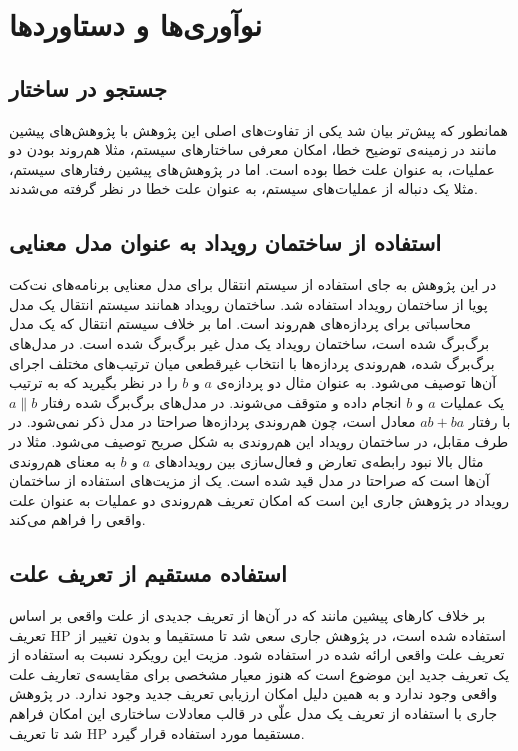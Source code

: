 \documentclass[
msc,
irfonts
]{./tex/tehran-thesis}
\newcommand{\پ}{پروژه/پایان‌نامه/رساله }
\theoremstyle{definition}
\theoremstyle{theorem}
\theoremstyle{definition}
\numberwithin{algorithm}{chapter}
\begin{document}
 \section{نوآوری‌ها و دستاورد‌ها}

 \subsection{جستجو در ساختار}
همانطور که پیش‌تر بیان شد یکی از تفاوت‌های اصلی این پژوهش با پژوهش‌های پیشین مانند
\cite{causality-checking,chockler,causal-hml}
در زمینه‌ی توضیح خطا، امکان معرفی ساختار‌های سیستم، مثلا هم‌روند بودن دو عملیات، به عنوان علت خطا بوده است.
اما در پژوهش‌های پیشین رفتار‌های سیستم، مثلا یک دنباله از عملیات‌های سیستم، به عنوان علت خطا در نظر گرفته می‌شدند.


 \subsection{استفاده از ساختمان رویداد به عنوان مدل معنایی}
در این پژوهش به جای استفاده از سیستم انتقال برای مدل معنایی برنامه‌های نت‌کت پویا از ساختمان رویداد استفاده شد.
ساختمان رویداد همانند سیستم انتقال یک مدل محاسباتی برای پردازه‌های هم‌روند است. 
اما بر خلاف سیستم انتقال که یک مدل برگ‌برگ شده است، ساختمان رویداد یک مدل غیر برگ‌برگ شده است.
در مدل‌های برگ‌برگ‌ شده، هم‌روندی پردازه‌ها با انتخاب غیرقطعی میان ترتیب‌های مختلف اجرای آن‌ها توصیف می‌شود.
به عنوان مثال دو پردازه‌ی 
$a$
و
$b$
را در نظر بگیرید که به ترتیب یک عملیات 
$a$
و
$b$
انجام داده و متوقف می‌شوند.
در مدل‌های برگ‌برگ‌ شده رفتار 
$a\parallel b$
با رفتار 
$ab + ba$
معادل است، چون هم‌روندی پردازه‌ها صراحتا در مدل ذکر نمی‌شود.
در طرف مقابل، در ساختمان رویداد این هم‌روندی به شکل صریح توصیف می‌شود.
مثلا در مثال بالا نبود رابطه‌ی تعارض و فعال‌سازی بین رویداد‌های 
$a$
و
$b$
به معنای هم‌روندی آن‌ها است که صراحتا در مدل قید شده است.
یک از مزیت‌های استفاده از ساختمان رویداد در پژوهش جاری این است که امکان تعریف هم‌روندی دو عملیات به عنوان علت واقعی را فراهم می‌کند.


 \subsection{استفاده مستقیم از تعریف علت}
بر خلاف کار‌های پیشین مانند
\cite{decomposing,causality-checking,Caltais-LTL,causal-hml}
که در آن‌ها از تعریف جدیدی از علت واقعی بر اساس تعریف 
HP
استفاده شده است، در پژوهش جاری سعی شد تا مستقیما و بدون تغییر از تعریف علت واقعی ارائه شده در 
\cite{hp}
استفاده شود.
مزیت این رویکرد نسبت به استفاده از یک تعریف جدید این موضوع است که هنوز معیار مشخصی برای مقایسه‌ی تعاریف علت واقعی وجود ندارد و به همین دلیل امکان ارزیابی تعریف جدید وجود ندارد.
در پژوهش جاری با استفاده از تعریف یک مدل علّی در قالب معادلات ساختاری این امکان فراهم شد تا تعریف 
HP
مستقیما مورد استفاده قرار گیرد.
\end{document}
